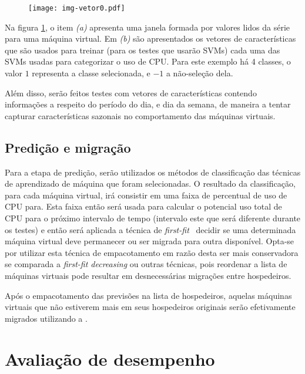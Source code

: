\begin{figure}[htp]
\centering
\texttt{[image: img-vetor0.pdf]}
\label{fig:vetor0}
\end{figure}

Na figura \ref{fig:vetor0}, o item \emph{(a)} apresenta uma janela
formada por valores lidos da série para uma máquina virtual. Em \emph{(b)}
são apresentados os vetores de características que são usados para treinar
(para os testes que usarão SVMs) cada uma das SVMs usadas para categorizar
o uso de CPU. Para este exemplo há 4 classes, o valor $1$ representa a
classe selecionada, e $-1$ a não-seleção dela.

Além disso, serão feitos testes com vetores de características contendo
informações a respeito do período do dia, e dia da semana, de maneira a
tentar capturar características sazonais no comportamento das máquinas
virtuais.

\subsection{Predição e migração}

Para a etapa de predição, serão utilizados os métodos de classificação das
técnicas de aprendizado de máquina que foram selecionadas. O resultado da
classificação, para cada máquina virtual, irá consistir em uma faixa de
percentual de uso de CPU para. Esta faixa então será usada para calcular o
potencial uso total de CPU para o próximo intervalo de tempo (intervalo
este que será diferente durante os testes) e então será aplicada a técnica
de \emph{first-fit}~\cite{yao1980new} decidir se uma determinada máquina
virtual deve permanecer ou ser migrada para outra disponível. Opta-se por
utilizar esta técnica de empacotamento em razão desta ser mais conservadora
se comparada a \emph{first-fit decreasing} ou outras técnicas, pois
reordenar a lista de máquinas virtuais pode resultar em desnecessárias
migrações entre hospedeiros.

Após o empacotamento das previsões na lista de hospedeiros, aquelas
máquinas virtuais que não estiverem mais em seus hospedeiros originais
serão efetivamente migrados utilizando a \libvirt{}.

\section{Avaliação de desempenho}\label{sec:desemp}

